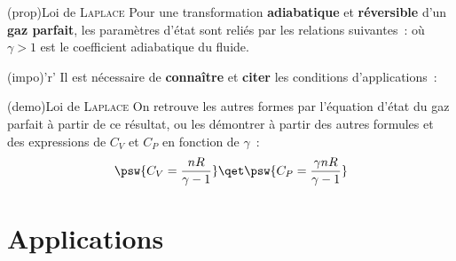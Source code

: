 \documentclass[../../main/main.tex]{subfiles}
\begin{document}
\begin{tcbraster}[raster equal height=rows, raster columns=3]
	\begin{tcb*}[raster multicolumn=2](prop){Loi de \textsc{Laplace}}
		Pour une transformation \textbf{adiabatique} et \textbf{réversible} d'un
		\textbf{gaz parfait}, les paramètres d'état sont reliés par les relations
		suivantes~:
		\psw{%
		\[
			PV^{\gamma} = \cte
			\qou
			P^{1-\gamma}T^{\gamma} = \cte
			\qou
			TV^{\gamma-1} = \cte
		\]
		}%
		où $\gamma > 1$ est le coefficient adiabatique du fluide.
	\end{tcb*}
	\begin{tcb*}[list entry={\lte Loi de \textsc{Laplace}}](impo)'r'{}
		Il est nécessaire de \textbf{connaître} et \textbf{citer} les
		conditions d'applications~:
		\begin{tasks}[label=\bdmd]
			\task {}
			\task {}
			\task {}
		\end{tasks}
	\end{tcb*}
\end{tcbraster}

\begin{tcb*}(demo){Loi de \textsc{Laplace}}
	On retrouve les autres formes par l'équation d'état du gaz parfait à partir de
	ce résultat, ou les démontrer à partir des autres formules et des expressions
	de $C_V$ et $C_P$ en fonction de $\gamma$~:
	\[
		\psw{C_V = \frac{nR}{\gamma-1}}
		\qet
		\psw{C_P = \frac{\gamma nR}{\gamma-1}}
	\]
\end{tcb*}

\section{Applications}
\end{document}
